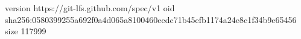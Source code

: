 version https://git-lfs.github.com/spec/v1
oid sha256:0580399255a692f0a4d065a8100460eedc71b45efb1174a24e8c1f34b9e65456
size 117999

